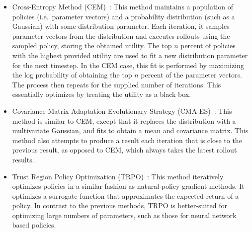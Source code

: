 \begin{itemize}
    \item Cross-Entropy Method (CEM)~\cite{rubinstein2013cross,
        policyoptimizationNIPS2016}: This method maintains a population of
        policies (i.e.\ parameter vectors) and a probability distribution (such
        as a Gaussian) with some distribution parameter.  Each iteration, it
        samples parameter vectors from the distribution and executes rollouts
        using the sampled policy, storing the obtained utility.  The top $n$
        percent of policies with the highest provided utility are used to fit
        a new distribution parameter for the next timestep. In the CEM case,
        this fit is performed by maximizing the log probability of obtaining
        the top $n$ percent of the parameter vectors. The process then repeats
        for the supplied number of iterations. This essentially optimizes by 
        treating the utility as a black box.

    \item Covariance Matrix Adaptation Evolutionary Strategy
        (CMA-ES)~\cite{cmaes, policyoptimizationNIPS2016}: This method is
        similar to CEM, except that it replaces the distribution with
        a multivariate Gaussian, and fits to obtain a mean and covariance matrix.
        This method also attempts to produce a result each iteration that is
        close to the previous result, as opposed to CEM, which always takes the
        latest rollout results.

    \item Trust Region Policy Optimization (TRPO)~\cite{TRPO,
        policyoptimizationNIPS2016}: This method iteratively optimizes policies
        in a similar fashion as natural policy gradient methods. It optimizes
        a surrogate function that approximates the expected return of a policy.
        In contrast to the previous methods, TRPO is better-suited for
        optimizing large numbers of parameters, such as those for neural
        network based policies.
\end{itemize}
